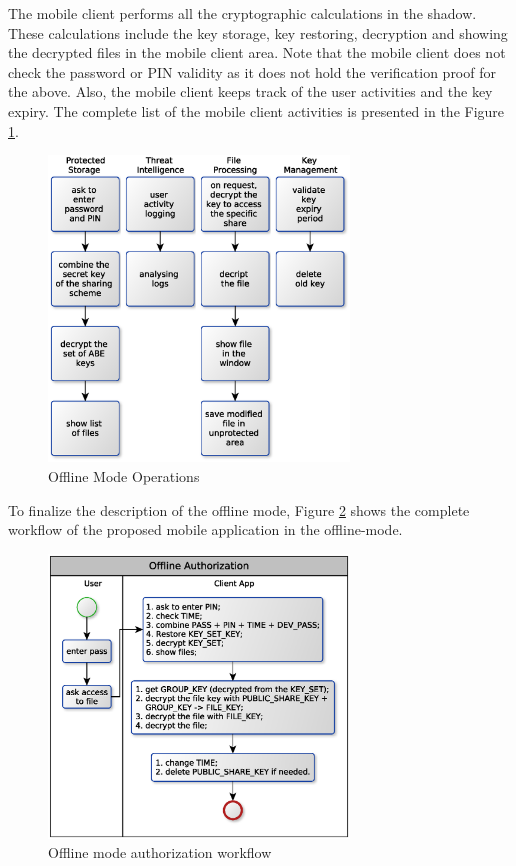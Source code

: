 \documentclass[twocolumn]{svjour3}          	%
\begin{document}
The mobile client performs all the cryptographic calculations in the shadow. These calculations include the key storage, key restoring, decryption and showing the decrypted files in the mobile client area. Note that the mobile client does not check the password or PIN validity as it does not hold the verification proof for the above. Also, the mobile client keeps track of the user activities and the key expiry. The complete list of the mobile client activities is presented in the Figure \ref{fig:04}.

\begin{figure}[h!]
	\centering
	\includegraphics[width=8cm]{fig04.eps}
	\caption{Offline Mode Operations}
	\label{fig:04}
\end{figure}

To finalize the description of the offline mode, Figure \ref{fig:05} shows the complete workflow of the proposed mobile application in the offline-mode.

\begin{figure}[h!]
	\centering
	\includegraphics[width=8cm]{fig05.eps}
	\caption{Offline mode authorization workflow}
	\label{fig:05}
\end{figure}
\end{document}
